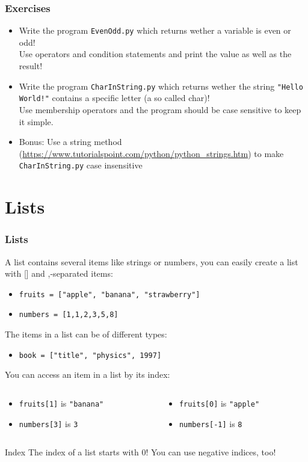 \documentclass{beamer}
\begin{document}
\begin{frame}
\frametitle{Exercises}
	\begin{itemize}
		\item Write the program \texttt{EvenOdd.py} which returns wether a variable is even or odd! \\ Use operators and condition statements and print the value as well as the result!
		\item Write the program \texttt{CharInString.py} which returns wether the string \texttt{"Hello World!"} contains a specific letter (a so called char)! \\ Use membership operators and the program should be case sensitive to keep it simple.
		\item Bonus: Use a string method (\url{https://www.tutorialspoint.com/python/python_strings.htm}) to make \texttt{CharInString.py} case insensitive
	\end{itemize}
\end{frame}


\section{Lists}

\begin{frame}
\frametitle{Lists}
	A list contains several items like strings or numbers, you can easily create a list with [] and ,-separated items: 
	\begin{itemize}
	\item \texttt{fruits = ["apple", "banana", "strawberry"]}
	\item \texttt{numbers = [1,1,2,3,5,8]}
	\end{itemize}
	The items in a list can be of different types:
	\begin{itemize}
	\item \texttt{book = ["title", "physics", 1997]} 
	\end{itemize}
	You can access an item in a list by its index:
	\begin{columns}[T]
	\begin{column}[T]{5cm}
		\begin{itemize}
			\item \texttt{fruits[1]} is \texttt{"banana"} 
			\item \texttt{numbers[3]} is \texttt{3}
		\end{itemize}
	\end{column}
	\begin{column}[T]{5cm}
		\begin{itemize}
			\item \texttt{fruits[0]} is \texttt{"apple"} 
			\item \texttt{numbers[-1]} is \texttt{8}
		\end{itemize}
	\end{column}
	\end{columns}
	\begin{alertblock}{Index}
	The index of a list starts with 0! You can use negative indices, too!
	\end{alertblock}
\end{frame}
\end{document}
